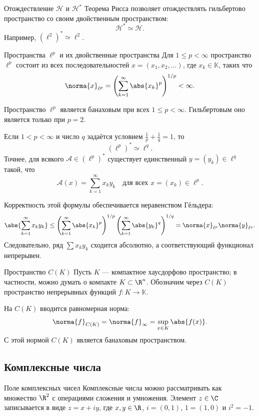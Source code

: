 \begin{Remark}{Отождествление $\mathcal H$ и $\mathcal H^*$}{}
	Теорема Рисса позволяет отождествлять гильбертово пространство со своим двойственным пространством:
	\[
	\mathcal H^*\simeq \mathcal H.
	\]
	Например, $(\ell^2)^*\simeq \ell^2$.
\end{Remark}

\begin{Example}{Пространства $\ell^p$ и их двойственные пространства}{}
	Для $1\le p<\infty$ пространство $\ell^p$ состоит из всех последовательностей $x=(x_1,x_2,\ldots)$, где $x_k\in\mathbb K$, таких что
	\[
	\norma{x}_{\ell^p}
	=
	\left(\sum_{k=1}^{\infty}\abs{x_k}^p\right)^{1/p}
	<\infty.
	\]
	
	Пространство $\ell^p$ является банаховым при всех $1\le p<\infty$. Гильбертовым оно является только при $p=2$.
	
	Если $1<p<\infty$ и число $q$ задаётся условием $\frac1p+\frac1q=1$, то
	\[
	(\ell^p)^*\simeq \ell^q.
	\]
	Точнее, для всякого $\mathcal A\in(\ell^p)^*$ существует единственный $y=(y_k)\in\ell^q$ такой, что
	\[
	\mathcal A(x)=\sum_{k=1}^{\infty}x_k y_k
	\quad \text{для всех } x=(x_k)\in\ell^p.
	\]
	
	Корректность этой формулы обеспечивается неравенством Гёльдера:
	\[
	\abs{\sum_{k=1}^{\infty}x_k y_k}
	\le
	\left(\sum_{k=1}^{\infty}\abs{x_k}^p\right)^{1/p}
	\left(\sum_{k=1}^{\infty}\abs{y_k}^q\right)^{1/q}
	=
	\norma{x}_{\ell^p}\norma{y}_{\ell^q}.
	\]
	Следовательно, ряд $\sum x_k y_k$ сходится абсолютно, а соответствующий функционал непрерывен.
\end{Example}

\begin{Definition}{Пространство $C(K)$}{}
	Пусть $K$ --- компактное хаусдорфово пространство; в частности, можно думать о компакте $K\subset\R^n$. Обозначим через $C(K)$ пространство непрерывных функций $f\colon K\to\mathbb K$.
	
	На $C(K)$ вводится равномерная норма:
	\[
	\norma{f}_{C(K)}
	=
	\norma{f}_{\infty}
	=
	\sup_{x\in K}\abs{f(x)}.
	\]
	С этой нормой $C(K)$ является банаховым пространством.
\end{Definition}

\subsection{Комплексные числа}

\begin{Definition}{Поле комплексных чисел}{}
	Комплексные числа можно рассматривать как множество $\R^2$ с операциями сложения и умножения. Элемент $z\in\C$ записывается в виде $z=x+iy$, где $x,y\in\R$, $i=(0,1)$, $1=(1,0)$ и $i^2=-1$.
\end{Definition}

